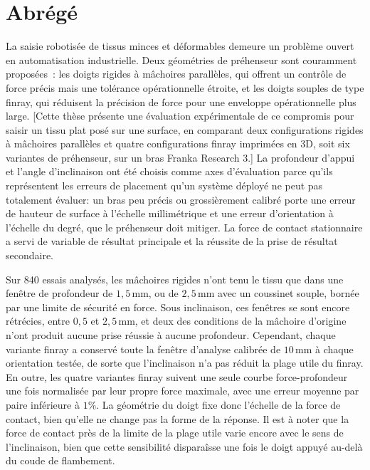 \chapter*{\rm\bfseries Abr\'eg\'e}

La saisie robotis\'ee de tissus minces et d\'eformables demeure un
probl\`eme ouvert en automatisation industrielle. Deux g\'eom\'etries de
pr\'ehenseur sont couramment propos\'ees~: les doigts rigides \`a
m\^achoires parall\`eles, qui offrent un contr\^ole de force pr\'ecis
mais une tol\'erance op\'erationnelle \'etroite, et les doigts souples
de type finray, qui r\'eduisent la pr\'ecision de force pour une
enveloppe op\'erationnelle plus large. [Cette th\`ese pr\'esente une
\'evaluation exp\'erimentale de ce compromis pour saisir un
tissu plat pos\'e sur une surface, en comparant deux configurations
rigides \`a m\^achoires parall\`eles et quatre configurations finray
imprim\'ees en 3D, soit six variantes de pr\'ehenseur, sur un bras
Franka Research 3.] La profondeur d'appui et l'angle d'inclinaison ont \'et\'e
choisis comme axes d'\'evaluation parce qu'ils repr\'esentent les
erreurs de placement qu'un syst\`eme d\'eploy\'e ne peut pas totalement
\'evaluer: un bras peu pr\'ecis ou grossi\`erement calibr\'e porte
une erreur de hauteur de surface \`a l'\'echelle millim\'etrique et une
erreur d'orientation \`a l'\'echelle du degr\'e, que le pr\'ehenseur
doit mitiger. La force de contact stationnaire a servi de variable de
r\'esultat principale et la r\'eussite de la prise de r\'esultat
secondaire.

Sur 840 essais analys\'es, les m\^achoires rigides n'ont tenu le tissu
que dans une fen\^etre de profondeur de $1{,}5$\,mm, ou de $2{,}5$\,mm
avec un coussinet souple, born\'ee par une limite de s\'ecurit\'e en
force. Sous inclinaison, ces fen\^etres se sont encore r\'etr\'ecies,
entre $0{,}5$ et $2{,}5$\,mm, et deux des conditions de la m\^achoire
d'origine n'ont produit aucune prise r\'eussie \`a aucune profondeur.
Cependant, chaque variante finray a conserv\'e toute la fen\^etre
d'analyse calibr\'ee de $10$\,mm \`a chaque orientation test\'ee, de
sorte que l'inclinaison n'a pas r\'eduit la plage utile du finray. En
outre, les quatre variantes finray suivent une seule courbe
force-profondeur une fois normalis\'ee par leur propre force maximale,
avec une erreur moyenne par paire inf\'erieure \`a $1\%$. La g\'eom\'etrie
du doigt fixe donc l'\'echelle de la force de contact, bien qu'elle ne
change pas la forme de la r\'eponse. Il est \`a noter que la force de
contact pr\`es de la limite de la plage utile varie encore avec le sens
de l'inclinaison, bien que cette sensibilit\'e dispara\^isse une fois le
doigt appuy\'e au-del\`a du coude de flambement.

